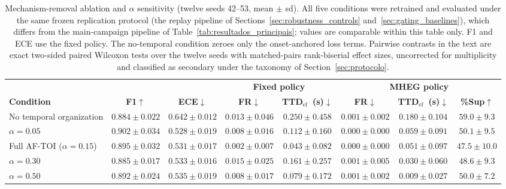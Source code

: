 \documentclass[a4paper,fleqn]{cas-dc}
\newcommand{\MHEG}{\mbox{MHEG}\xspace}
\begin{document}
\begin{table}[!tbp]
\color{\revcolor}
\centering
\caption{Mechanism-removal ablation and $\alpha$ sensitivity (twelve seeds
42--53, mean $\pm$ sd). All five conditions were retrained and evaluated
under the same frozen replication protocol (the replay pipeline of
Sections~\ref{sec:robustness_controls}
and~\ref{sec:gating_baselines}), which differs from the main-campaign
pipeline of Table~\ref{tab:resultados_principais}; values are comparable
within this table only. F1 and ECE use the fixed policy. The no-temporal condition zeroes only the
onset-anchored loss terms. Pairwise contrasts in the text are exact two-sided
paired Wilcoxon tests over the twelve seeds with matched-pairs rank-biserial
effect sizes, uncorrected for multiplicity and classified as secondary under
the taxonomy of Section~\ref{sec:protocolo}.}
\label{tab:ablacao_alpha}
\footnotesize
\setlength{\tabcolsep}{5pt}
\renewcommand{\arraystretch}{1.2}
\begin{tabular}{l c c cc ccc}
\toprule
& & & \multicolumn{2}{c}{\textbf{Fixed policy}}
  & \multicolumn{3}{c}{\textbf{\MHEG policy}} \\
\cmidrule(lr){4-5}\cmidrule(lr){6-8}
\textbf{Condition} & \textbf{F1}$\uparrow$ & \textbf{ECE}$\downarrow$
  & \textbf{FR}$\downarrow$ & \textbf{TTD$_{\mathrm{ef}}$~(s)}$\downarrow$
  & \textbf{FR}$\downarrow$ & \textbf{TTD$_{\mathrm{ef}}$~(s)}$\downarrow$
  & \textbf{\%Sup}$\uparrow$ \\
\midrule
No temporal organization & $0.884 \pm 0.022$ & $0.642 \pm 0.012$
  & $0.013 \pm 0.046$ & $0.250 \pm 0.458$
  & $0.001 \pm 0.002$ & $0.180 \pm 0.104$ & $59.0 \pm 9.3$ \\
$\alpha=0.05$ & $0.902 \pm 0.034$ & $0.528 \pm 0.019$
  & $0.008 \pm 0.016$ & $0.112 \pm 0.160$
  & $0.000 \pm 0.000$ & $0.059 \pm 0.091$ & $50.1 \pm 9.5$ \\
\rowcolor{gray!8}
Full \mbox{AF-TOI} ($\alpha=0.15$) & $0.895 \pm 0.032$ & $0.531 \pm 0.017$
  & $0.002 \pm 0.007$ & $\mathbf{0.043 \pm 0.082}$
  & $0.000 \pm 0.000$ & $0.051 \pm 0.097$ & $47.5 \pm 10.0$ \\
$\alpha=0.30$ & $0.885 \pm 0.017$ & $0.533 \pm 0.016$
  & $0.015 \pm 0.025$ & $0.161 \pm 0.257$
  & $0.001 \pm 0.005$ & $0.030 \pm 0.060$ & $48.6 \pm 9.3$ \\
$\alpha=0.50$ & $0.892 \pm 0.024$ & $0.535 \pm 0.019$
  & $0.008 \pm 0.017$ & $0.079 \pm 0.172$
  & $0.001 \pm 0.002$ & $0.009 \pm 0.027$ & $50.0 \pm 7.2$ \\
\bottomrule
\end{tabular}
\end{table}
\end{document}
